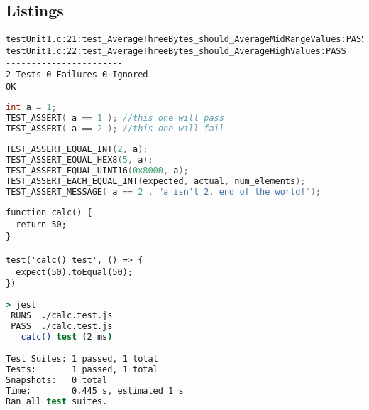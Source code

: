 \newpage
\subsection{Listings}
\renewcommand{\lstlistlistingname}{}
\lstlistoflistings
\hfill

\begin{lstlisting}[label={lst:unity-report}, caption=Example Unity Test Report Output \cite{unity-homepage}]
testUnit1.c:21:test_AverageThreeBytes_should_AverageMidRangeValues:PASS
testUnit1.c:22:test_AverageThreeBytes_should_AverageHighValues:PASS
-----------------------
2 Tests 0 Failures 0 Ignored
OK
\end{lstlisting}

\begin{lstlisting}[language=C, label={lst:unity-test-assert}, caption=Unity Basic Assertion Example
\cite{unity-homepage}]
int a = 1;
TEST_ASSERT( a == 1 ); //this one will pass
TEST_ASSERT( a == 2 ); //this one will fail
\end{lstlisting}

\begin{lstlisting}[language=c, label={lst:unity-more-test-assert}, caption=More advanced Unity Assertions
\cite{unity-github}]
TEST_ASSERT_EQUAL_INT(2, a);
TEST_ASSERT_EQUAL_HEX8(5, a);
TEST_ASSERT_EQUAL_UINT16(0x8000, a);
TEST_ASSERT_EACH_EQUAL_INT(expected, actual, num_elements);
TEST_ASSERT_MESSAGE( a == 2 , "a isn't 2, end of the world!");
\end{lstlisting}

\begin{lstlisting}[style=ES6, label=lst:jest-example, caption={Jest Unit Testing Example}]
function calc() {
  return 50;
}

test('calc() test', () => {
  expect(50).toEqual(50);
})
\end{lstlisting}

\begin{lstlisting}[language=csh, label=lst:jest-output, caption={Jest Unit
Testing Example Output}]
> jest
 RUNS  ./calc.test.js
 PASS  ./calc.test.js
   calc() test (2 ms)

Test Suites: 1 passed, 1 total
Tests:       1 passed, 1 total
Snapshots:   0 total
Time:        0.445 s, estimated 1 s
Ran all test suites.
\end{lstlisting}
